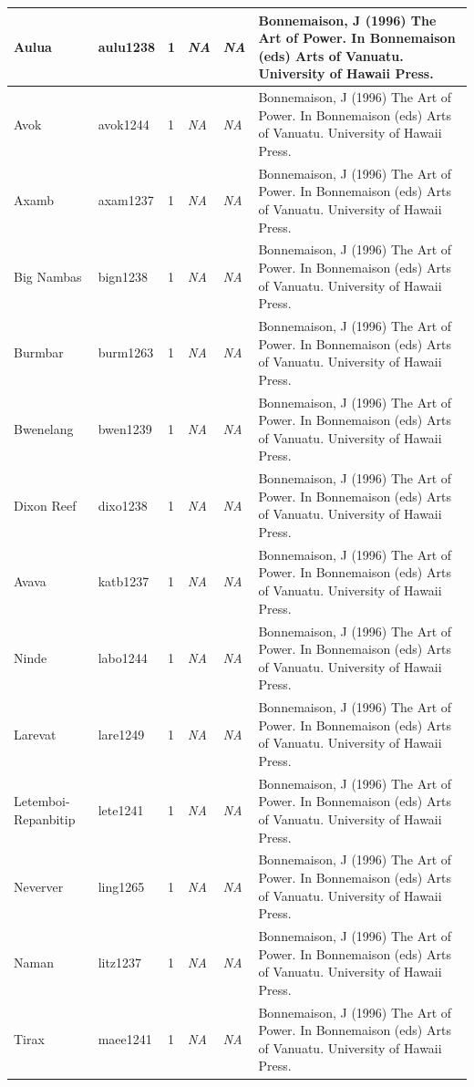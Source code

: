 \documentclass[a4paper,10pt]{article} %
\begin{document}
\begin{landscape}
\begin{longtable}{ | p{2cm}| p{2cm}| p{1.8cm}| p{1.8cm}| p{3cm}| p{9cm}| }
Aulua&aulu1238&1&\emph{NA}&\emph{NA}&Bonnemaison, J (1996) The Art of Power. In Bonnemaison (eds) Arts of Vanuatu. University of Hawaii Press.\\ \hline
Avok&avok1244&1&\emph{NA}&\emph{NA}&Bonnemaison, J (1996) The Art of Power. In Bonnemaison (eds) Arts of Vanuatu. University of Hawaii Press.\\ \hline
Axamb&axam1237&1&\emph{NA}&\emph{NA}&Bonnemaison, J (1996) The Art of Power. In Bonnemaison (eds) Arts of Vanuatu. University of Hawaii Press.\\ \hline
Big Nambas&bign1238&1&\emph{NA}&\emph{NA}&Bonnemaison, J (1996) The Art of Power. In Bonnemaison (eds) Arts of Vanuatu. University of Hawaii Press.\\ \hline
Burmbar&burm1263&1&\emph{NA}&\emph{NA}&Bonnemaison, J (1996) The Art of Power. In Bonnemaison (eds) Arts of Vanuatu. University of Hawaii Press.\\ \hline
Bwenelang&bwen1239&1&\emph{NA}&\emph{NA}&Bonnemaison, J (1996) The Art of Power. In Bonnemaison (eds) Arts of Vanuatu. University of Hawaii Press.\\ \hline
Dixon Reef&dixo1238&1&\emph{NA}&\emph{NA}&Bonnemaison, J (1996) The Art of Power. In Bonnemaison (eds) Arts of Vanuatu. University of Hawaii Press.\\ \hline
Avava&katb1237&1&\emph{NA}&\emph{NA}&Bonnemaison, J (1996) The Art of Power. In Bonnemaison (eds) Arts of Vanuatu. University of Hawaii Press.\\ \hline
Ninde&labo1244&1&\emph{NA}&\emph{NA}&Bonnemaison, J (1996) The Art of Power. In Bonnemaison (eds) Arts of Vanuatu. University of Hawaii Press.\\ \hline
Larevat&lare1249&1&\emph{NA}&\emph{NA}&Bonnemaison, J (1996) The Art of Power. In Bonnemaison (eds) Arts of Vanuatu. University of Hawaii Press.\\ \hline
Letemboi-Repanbitip&lete1241&1&\emph{NA}&\emph{NA}&Bonnemaison, J (1996) The Art of Power. In Bonnemaison (eds) Arts of Vanuatu. University of Hawaii Press.\\ \hline
Neverver&ling1265&1&\emph{NA}&\emph{NA}&Bonnemaison, J (1996) The Art of Power. In Bonnemaison (eds) Arts of Vanuatu. University of Hawaii Press.\\ \hline
Naman&litz1237&1&\emph{NA}&\emph{NA}&Bonnemaison, J (1996) The Art of Power. In Bonnemaison (eds) Arts of Vanuatu. University of Hawaii Press.\\ \hline
Tirax&maee1241&1&\emph{NA}&\emph{NA}&Bonnemaison, J (1996) The Art of Power. In Bonnemaison (eds) Arts of Vanuatu. University of Hawaii Press.\\ \hline

\end{longtable}
\end{landscape}
\end{document}
